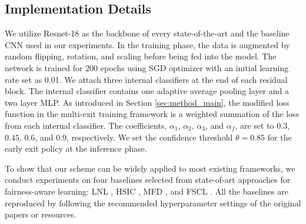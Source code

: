 

\subsection{Implementation Details}
We utilize Resnet-18 as the backbone of every state-of-the-art and the baseline CNN used in our experiments. 
In the training phase, the data is augmented by random flipping, rotation, and scaling before being fed into the model. The network is trained for 200 epochs using SGD optimizer \cite{ruder2016overview} with an initial learning rate set as 0.01. We attach three internal classifiers at the end of each residual block. The internal classifier contains one adaptive average pooling layer and a two layer MLP. As introduced in Section \ref{sec:method_main}, the modified loss function in the multi-exit training framework is a weighted summation of the loss from each internal classifier. The coefficients, $\alpha_1$, $\alpha_2$, $\alpha_3$, and $\alpha_f$, are set to $0.3$, $0.45$, $0.6$, and $0.9$, respectively. We set the confidence threshold $\theta=0.85$ for the early exit policy at the inference phase.  

To show that our scheme can be widely applied to most existing frameworks, we conduct experiments on four baselines selected from state-of-art approaches for fairness-aware learning: LNL \cite{kim2019learning}, HSIC \cite{quadrianto2019discovering}, MFD \cite{jung2021fair}, and FSCL \cite{park2022fair}. All the baselines are reproduced by following the recommended hyperparameter settings of the original papers or resources.
 





